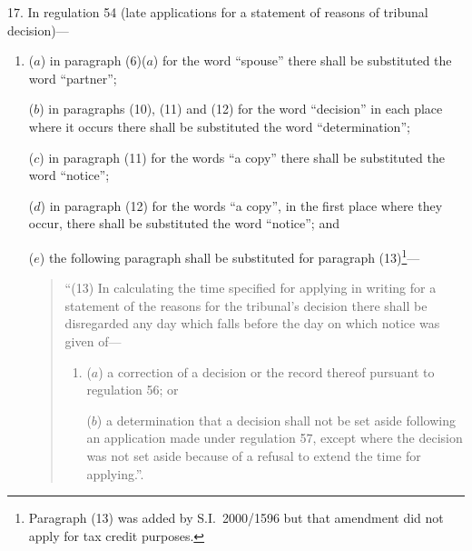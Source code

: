 \documentclass[12pt,a4paper]{article}
\begin{document}
\medskip

17.  In regulation 54 (late applications for a statement of reasons of tribunal decision)—
\begin{enumerate}\item[]
($a$) in paragraph (6)($a$)  for the word “spouse” there shall be substituted the word “partner”;

($b$) in paragraphs (10), (11) and (12) for the word “decision” in each place where it occurs there shall be substituted the word “determination”;

($c$) in paragraph (11) for the words “a copy” there shall be substituted the word “notice”;

($d$) in paragraph (12) for the words “a copy”, in the first place where they occur, there shall be substituted the word “notice”; and

($e$) the following paragraph shall be substituted for paragraph (13)\footnote{Paragraph (13) was added by S.I.\ 2000/1596 but that amendment did not apply for tax credit purposes.}—
\begin{quotation}
“(13) In calculating the time specified for applying in writing for a statement of the reasons for the tribunal’s decision there shall be disregarded any day which falls before the day on which notice was given of—
\begin{enumerate}\item[]
($a$) a correction of a decision or the record thereof pursuant to regulation 56; or

($b$) a determination that a decision shall not be set aside following an application made under regulation 57, except where the decision was not set aside because of a refusal to extend the time for applying.”.
\end{enumerate}
\end{quotation}
\end{enumerate}

\medskip
\end{document}
